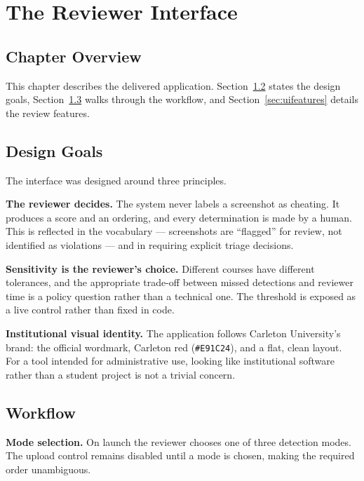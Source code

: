 \documentclass[12pt,oneside]{report}
\newcommand{\code}[1]{\texttt{\small #1}}
\begin{document}
\chapter{The Reviewer Interface}
\label{ch:interface}

\section{Chapter Overview}

This chapter describes the delivered application. Section~\ref{sec:uigoals}
states the design goals, Section~\ref{sec:uiwalk} walks through the workflow,
and Section~\ref{sec:uifeatures} details the review features.

\section{Design Goals}
\label{sec:uigoals}

The interface was designed around three principles.

\textbf{The reviewer decides.} The system never labels a screenshot as
cheating. It produces a score and an ordering, and every determination is made
by a human. This is reflected in the vocabulary --- screenshots are ``flagged''
for review, not identified as violations --- and in requiring explicit triage
decisions.

\textbf{Sensitivity is the reviewer's choice.} Different courses have different
tolerances, and the appropriate trade-off between missed detections and
reviewer time is a policy question rather than a technical one. The threshold
is exposed as a live control rather than fixed in code.

\textbf{Institutional visual identity.} The application follows Carleton
University's brand: the official wordmark, Carleton red (\code{\#E91C24}), and
a flat, clean layout. For a tool intended for administrative use, looking like
institutional software rather than a student project is not a trivial concern.

\section{Workflow}
\label{sec:uiwalk}

\textbf{Mode selection.} On launch the reviewer chooses one of three detection
modes. The upload control remains disabled until a mode is chosen, making the
required order unambiguous.
\end{document}
